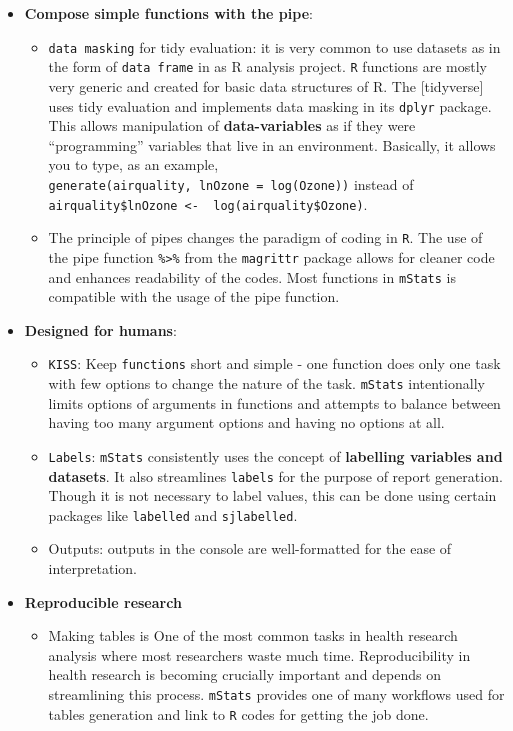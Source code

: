 \documentclass[
]{book}
\providecommand{\tightlist}{%
  \setlength{\itemsep}{0pt}\setlength{\parskip}{0pt}}
\begin{document}
\begin{itemize}
\item
  \textbf{Compose simple functions with the pipe}:

  \begin{itemize}
  \item
    \texttt{data\ masking} for tidy evaluation: it is very common to use datasets as in the form of \texttt{data\ frame} in as R analysis project. \texttt{R} functions are mostly very generic and created for basic data structures of R. The {[}tidyverse{]} uses tidy evaluation and implements data masking in its \texttt{dplyr} package. This allows manipulation of \textbf{data-variables} as if they were ``programming'' variables that live in an environment. Basically, it allows you to type, as an example, \texttt{generate(airquality,\ lnOzone\ =\ log(Ozone))} instead of \texttt{airquality\$lnOzone\ \textless{}-\ \ log(airquality\$Ozone)}.
  \item
    The principle of pipes changes the paradigm of coding in \texttt{R}. The use of the pipe function \texttt{\%\textgreater{}\%} from the \texttt{magrittr} package allows for cleaner code and enhances readability of the codes. Most functions in \texttt{mStats} is compatible with the usage of the pipe function.
  \end{itemize}
\item
  \textbf{Designed for humans}:

  \begin{itemize}
  \item
    \texttt{KISS}: Keep \texttt{functions} short and simple - one function does only one task with few options to change the nature of the task. \texttt{mStats} intentionally limits options of arguments in functions and attempts to balance between having too many argument options and having no options at all.
  \item
    \texttt{Labels}: \texttt{mStats} consistently uses the concept of \textbf{labelling variables and datasets}. It also streamlines \texttt{labels} for the purpose of report generation. Though it is not necessary to label values, this can be done using certain packages like \texttt{labelled} and \texttt{sjlabelled}.
  \item
    Outputs: outputs in the console are well-formatted for the ease of interpretation.
  \end{itemize}
\item
  \textbf{Reproducible research}

  \begin{itemize}
  \tightlist
  \item
    Making tables is One of the most common tasks in health research analysis where most researchers waste much time. Reproducibility in health research is becoming crucially important and depends on streamlining this process. \texttt{mStats} provides one of many workflows used for tables generation and link to \texttt{R} codes for getting the job done.
  \end{itemize}
\end{itemize}
\end{document}
